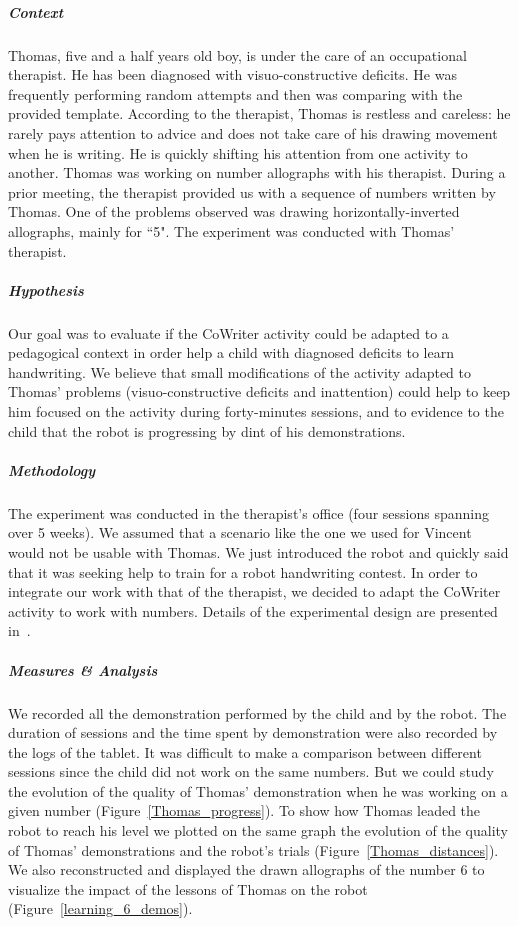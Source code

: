 \documentclass[10pt,a4paper]{article}
\begin{document}
\subparagraph{Context}
Thomas, five and a half years old boy, is under the care of an occupational
therapist. He has been diagnosed with visuo-constructive deficits.
He was frequently performing random attempts and then was comparing
with the provided template. According to the therapist, Thomas is restless and careless: he
rarely pays attention to
advice and does not take care of his drawing movement when he is writing. He is
quickly shifting his attention from one activity to another. Thomas was working on number allographs with his therapist. During a prior
meeting, the therapist provided us with a sequence of numbers
written by Thomas. One of the problems observed was drawing
horizontally-inverted allographs, mainly for ``5". The experiment was conducted with Thomas' therapist. 
\subparagraph{Hypothesis}
Our goal was to evaluate if the CoWriter activity could be adapted to a pedagogical context in order help a child with diagnosed deficits to learn handwriting. We believe that small modifications of the activity adapted to
Thomas' problems (visuo-constructive deficits and inattention) could help to
keep him focused on the activity during forty-minutes sessions, and to evidence to the child that the robot is progressing by dint of his demonstrations. 
\subparagraph{Methodology}
The experiment was conducted in the therapist's office (four sessions 
spanning over 5 weeks). We assumed that a scenario like the one we used 
for Vincent would not be usable with Thomas. We just introduced the robot 
and quickly said that it was seeking help to train for a robot handwriting contest. In order to integrate our work with that of the therapist, we decided to adapt the 
CoWriter activity to work with numbers. Details of the experimental design are presented in~\cite{jacq2016building}.
\subparagraph{Measures \& Analysis}
We recorded all the demonstration performed by the child and by the robot. The duration of sessions and the time spent by demonstration were also recorded by the logs of the tablet. It was difficult to make a comparison between different sessions since the child did not work on the same numbers. But we could study the evolution of the quality of Thomas' demonstration when he was working on a given number (Figure~\ref{Thomas_progress}).
To show how Thomas leaded the robot to reach his level we plotted on the same graph the evolution of the quality of Thomas' demonstrations and the robot's trials (Figure~\ref{Thomas_distances}). We also reconstructed and displayed the drawn allographs of the number 6 to visualize the impact of the lessons of Thomas on the robot (Figure~\ref{learning_6_demos}). 
\end{document}
